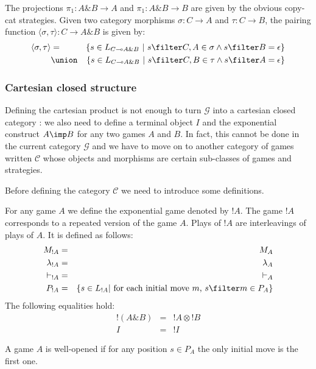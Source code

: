 The projections $\pi_1:A \& B \rightarrow A$ and $\pi_1:A \& B
\rightarrow B$ are given by the obvious copy-cat strategies. Given
two category morphisms $\sigma :C \rightarrow A$ and $\tau : C
\rightarrow B$, the pairing function $\langle \sigma, \tau \rangle :
C \rightarrow A \& B$ is given by:
\begin{eqnarray*}
\langle \sigma, \tau \rangle &=& \{ s \in L_{C\multimap A\&B} \ | \ s \filter C,A \in \sigma \wedge s \filter B = \epsilon  \} \\
&\union& \{ s \in L_{C\multimap A\&B} \ | \ s \filter C,B \in \tau \wedge s \filter A = \epsilon  \}
\end{eqnarray*}

\subsubsection{Cartesian closed structure}
Defining the cartesian product is not enough to turn $\mathcal{G}$
into a cartesian closed category : we also need to define a terminal
object $I$ and the exponential construct $A \imp B$ for any two
games $A$ and $B$. In fact, this cannot be done in the current
category $\mathcal{G}$ and we have to move on to another category of
games written $\mathcal{C}$ whose objects and morphisms are certain
sub-classes of games and strategies.

Before defining the category $\mathcal{C}$ we need to introduce some
definitions.


For any game $A$ we define the exponential game denoted by $!A$. The
game $!A$ corresponds to a repeated version of the game $A$. Plays
of $!A$ are interleavings of plays of $A$. It is defined as follows:
\begin{eqnarray*}
  M_{!A} &=& M_A \\
  \lambda_{!A} &=& \lambda_A \\
  \vdash_{!A} & = & \vdash_{A} \\
  P_{!A} & = & \{ s \in L_{!A} | \mbox{ for each initial move $m$, } s \filter m \in P_A \}
\end{eqnarray*}
The following equalities hold:
\begin{eqnarray*}
  !(A \& B) &=& !A \otimes !B\\
  I &=& !I
\end{eqnarray*}

\begin{definition}
A game $A$ is well-opened if for any position $s \in P_A$ the only initial move is the first
one.
\end{definition}


